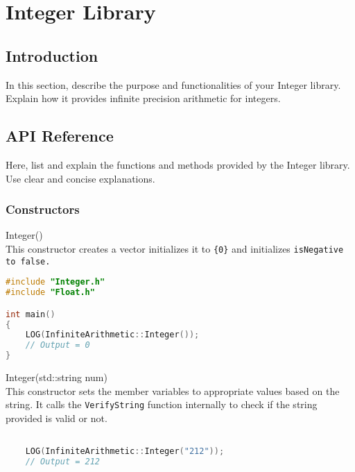 
\section{Integer Library}

\subsection{Introduction}

In this section, describe the purpose and functionalities of your Integer library. Explain how it provides infinite precision arithmetic for integers. 

\subsection{API Reference}

Here, list and explain the functions and methods provided by the Integer library. Use clear and concise explanations.

\subsubsection{Constructors} \vspace*{1em}

{\ttfamily \large Integer()} \\[2mm]
This constructor creates a vector initializes it to \verb|{0}| and initializes \tt{isNegative} to \tt{false}.
\vspace*{1em}
\begin{lstlisting}[language = C]
#include "Integer.h"
#include "Float.h"

int main()
{
	LOG(InfiniteArithmetic::Integer());
	// Output = 0
}
\end{lstlisting}
\vspace*{1em}


\noindent
{\ttfamily \large Integer(std::string num)} \\[2mm]
This constructor sets the member variables to appropriate values based on the string. It calls the \verb|VerifyString| function internally to check if the string provided is valid or not.
\vspace*{1em}
\begin{lstlisting}[language = C]

	LOG(InfiniteArithmetic::Integer("212"));
	// Output = 212
	
\end{lstlisting}
\vspace*{1em}


